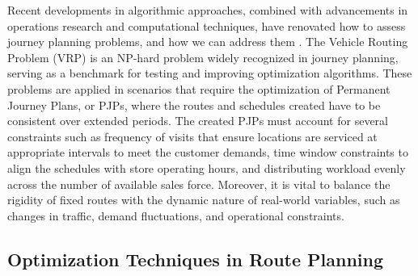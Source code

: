 Recent developments in algorithmic approaches, combined with advancements in operations research and computational techniques, have renovated how to assess journey planning problems, and how we can address them \cite{almaatani2014new}. The Vehicle Routing Problem (VRP) is an NP-hard problem widely recognized in journey planning, serving as a benchmark for testing and improving optimization algorithms. These problems are applied in scenarios that require the optimization of Permanent Journey Plans, or PJPs, where the routes and schedules created have to be consistent over extended periods. The created PJPs must account for several constraints such as frequency of visits that ensure locations are serviced at appropriate intervals to meet the customer demands, time window constraints to align the schedules with store operating hours, and distributing workload evenly across the number of available sales force. Moreover, it is vital to balance the rigidity of fixed routes with the dynamic nature of real-world variables, such as changes in traffic, demand fluctuations, and operational constraints.

\subsection{Optimization Techniques in Route Planning
}

